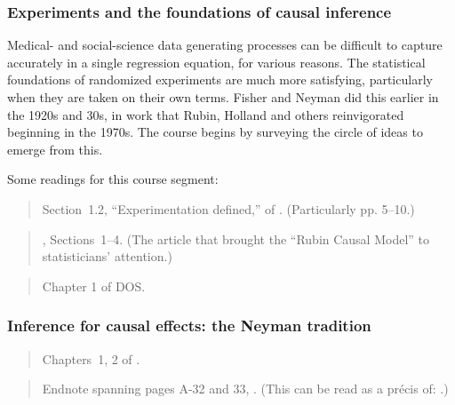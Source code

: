 \documentclass[12pt]{article}
\begin{document}
\subsubsection{Experiments and the foundations of causal inference}

Medical- and social-science data generating processes can be difficult to
capture accurately in a single regression equation, for various reasons.  
The statistical foundations of randomized experiments are much more
satisfying, particularly when they are taken on their own
terms. Fisher and Neyman did this earlier in the 1920s and 30s, in
work that Rubin, Holland and others reinvigorated beginning in the
1970s.  The course begins by surveying the circle of ideas to emerge
from this. 


Some readings for this course segment:
\begin{verse} Section~1.2, ``Experimentation defined,''  of 
.  (Particularly pp. 5--10.) \end{verse}

\begin{verse}, Sections~1--4. (The article that brought the ``Rubin 
  Causal Model'' to  statisticians' attention.)\end{verse}

\begin{verse}
  Chapter 1 of DOS.
\end{verse}


\subsubsection{Inference for causal effects: the Neyman tradition}

\begin{verse}
  Chapters~1, 2 of .
\end{verse}

\begin{verse} Endnote spanning pages A-32 and 33,
  .  (This can be read as a pr{\'e}cis
  of: .)\end{verse}
\end{document}
